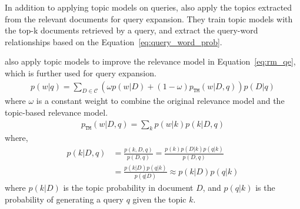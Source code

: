 In addition to applying topic models on queries, \cite{Yi-2009} also apply the topics extracted from the relevant documents for query expansion. They train topic models with the top-k documents retrieved by a query, and extract the query-word relationships based on the Equation~\ref{eq:query_word_prob}.

\cite{Yi-2009} also apply topic models to improve the relevance model in Equation~\ref{eq:rm_qe}, which is further used for query expansion.
\begin{align}
p(w|q) = \sum_{D \in \mathcal{C}} (\omega p(w|D) + (1 - \omega)p_{\texttt{TM}}(w|D,q))p(D|q)
\end{align}
where $\omega$ is a constant weight to combine the original relevance model and the topic-based relevance model.
\begin{align}
p_{\texttt{TM}}(w|D,q) = \sum_k p(w|k) p(k|D,q)
\end{align}
where,
\begin{align}
p(k|D,q) &= \frac{p(k,D,q)}{p(D,q)}  = \frac{p(k)p(D|k)p(q|k)}{p(D,q)} \\
&= \frac{p(k|D)p(q|k)}{p(q|D)} \approx p(k|D)p(q|k)
\end{align}
where $p(k|D)$ is the topic probability in document $D$, and $p(q|k)$ is the probability of generating a query $q$ given the topic $k$.

